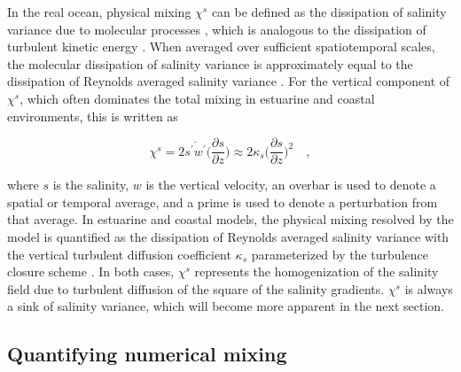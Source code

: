 \documentclass[draft]{agujournal2019}
\begin{document}
In the real ocean, physical mixing $\chi^s$ can be defined as the dissipation of salinity variance due to molecular processes \cite{Burchard_2009}, which is analogous to the dissipation of turbulent kinetic energy \cite{MacCready_2018}. When averaged over sufficient spatiotemporal scales, the molecular dissipation of salinity variance is approximately equal to the dissipation of Reynolds averaged salinity variance \cite{Burchard_2008, Nash_2002, osborn1972oceanic}. For the vertical component of $\chi^s$, which often dominates the total mixing in estuarine and coastal environments, this is written as
\begin{linenomath*}
\begin{equation}
    \chi^s = 2 \overline{s^\prime w^\prime} \bigg(\frac{\partial s}{\partial z} \bigg) \approx 2 \kappa_s \bigg(\frac{\partial s}{\partial z} \bigg)^2 \quad , 
\end{equation}
\end{linenomath*}
where $s$ is the salinity, $w$ is the vertical velocity, an overbar is used to denote a spatial or temporal average, and a prime is used to denote a perturbation from that average. In estuarine and coastal models, the physical mixing resolved by the model is quantified as the dissipation of Reynolds averaged salinity variance with the vertical turbulent diffusion coefficient $\kappa_s$ parameterized by the turbulence closure scheme \cite{Burchard_2008, MacCready_2018}. In both cases, $\chi^s$ represents the homogenization of the salinity field due to turbulent diffusion of the square of the salinity gradients. $\chi^s$ is always a sink of salinity variance, which will become more apparent in the next section.

\subsection{Quantifying numerical mixing}
\end{document}
